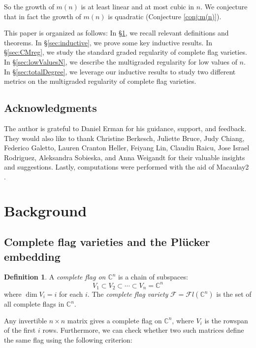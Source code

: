 \documentclass[12pt,reqno]{amsart}
\theoremstyle{definition}
\newtheorem{definition}[theorem]{Definition}
\theoremstyle{remark}
\newcommand{\calF}{{\mathcal{F}}}
\begin{document}
So the growth of $m(n)$ is at least linear and at most cubic in $n$.  We conjecture that in fact the growth of $m(n)$ is quadratic (Conjecture \ref{conj:m(n)}).

This paper is organized as follows: In \S \ref{sec:background}, we recall relevant definitions and theorems.  In \S \ref{sec:inductive}, we prove some key inductive results. In \S \ref{sec:CMreg}, we study the standard graded regularity of complete flag varieties.  In \S \ref{sec:lowValuesN}, we describe the multigraded regularity for low values of $n$.  In \S \ref{sec:totalDegree}, we leverage our inductive results to study two different metrics on the multigraded regularity of complete flag varieties.

\subsection*{Acknowledgments}
The author is grateful to Daniel Erman for his guidance, support, and feedback.  They would also like to thank Christine Berkesch, Juliette Bruce, Judy Chiang, Federico Galetto, Lauren Cranton Heller, Feiyang Lin, Claudiu Raicu, Jose Israel Rodriguez,  Aleksandra Sobieska, and Anna Weigandt for their valuable insights and suggestions.  Lastly, computations were performed with the aid of Macaulay2 \cite{M2}.


\section{Background}\label{sec:background}

\subsection{Complete flag varieties and the Pl\"ucker embedding}

\begin{definition}
A \textit{complete flag on $\mathbb C^n$} is a chain of subspaces:
\[
V_1 \subset V_2 \subset \cdots \subset V_n = \mathbb C^n
\]
where $\dim V_i = i$ for each $i$.  The \textit{complete flag variety} $\calF = \calF l(\mathbb C^n)$ is the set of all complete flags in $\mathbb C^n$.
\end{definition}

Any invertible $n \times n$ matrix gives a complete flag on $\mathbb C^n$, where $V_i$ is the rowspan of the first $i$ rows.  Furthermore, we can check whether two such matrices define the same flag using the following criterion:
\end{document}
